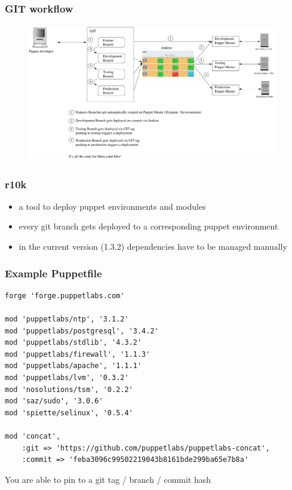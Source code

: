 \documentclass{beamer}
\begin{document}
\begin{frame}
  \frametitle{GIT workflow}
  \begin{figure}
    \centering
      \includegraphics[height=6cm,width=11cm]{../pics/puppet_deployment2}
    \label{fig:stack}
  \end{figure}

\end{frame}

\begin{frame}
  \frametitle{r10k}

  \begin{itemize}
  \item a tool to deploy puppet environments and modules
  \item every git branch gets deployed to a corresponding puppet environment
  \item in the current version (1.3.2) dependencies have to be managed
    manually
  \end{itemize}
\end{frame}

  \begin{frame}[fragile]
    \frametitle{Example Puppetfile}
\begin{lstlisting}
forge 'forge.puppetlabs.com'

mod 'puppetlabs/ntp', '3.1.2'
mod 'puppetlabs/postgresql', '3.4.2'
mod 'puppetlabs/stdlib', '4.3.2'
mod 'puppetlabs/firewall', '1.1.3'
mod 'puppetlabs/apache', '1.1.1'
mod 'puppetlabs/lvm', '0.3.2'
mod 'nosolutions/tsm', '0.2.2'
mod 'saz/sudo', '3.0.6'
mod 'spiette/selinux', '0.5.4'

mod 'concat',
    :git => 'https://github.com/puppetlabs/puppetlabs-concat',
    :commit => 'feba3096c99502219043b8161bde299ba65e7b8a'
\end{lstlisting}

    You are able to pin to a git tag / branch / commit hash

\end{frame}
\end{document}
